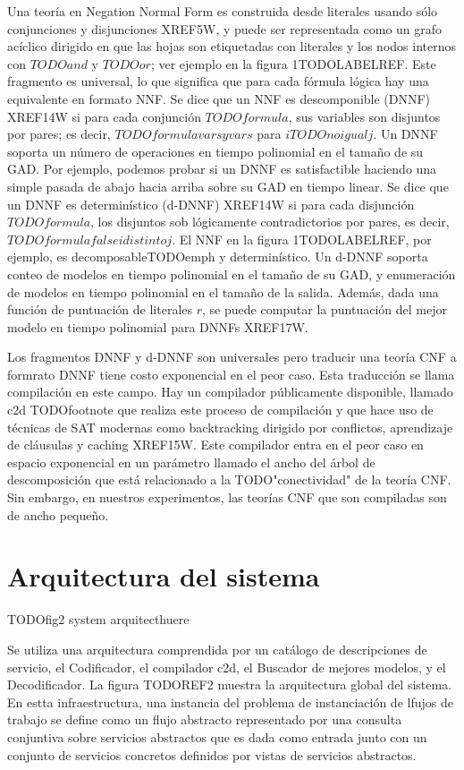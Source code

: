 \documentclass{article}
\begin{document}
Una teoría en Negation Normal Form es construida desde literales usando sólo
conjunciones y disjunciones XREF5W, y puede ser representada como un grafo
acíclico dirigido en que las hojas son etiquetadas con literales y los nodos
internos con $TODOand$ y $TODOor$; ver ejemplo en la figura  1TODOLABELREF. Este
fragmento es universal, lo que significa que para cada fórmula lógica hay una
equivalente en formato NNF. Se dice que un NNF es descomponible (DNNF) XREF14W
si para cada conjunción $TODOformula$, sus variables son disjuntos por pares; es
decir, $TODO formula vars y vars$ para $i TODOnoigual j$. Un DNNF soporta un
número de operaciones en tiempo polinomial en el tamaño de su GAD. Por ejemplo,
podemos probar si un DNNF es satisfactible haciendo una simple pasada de abajo
hacia arriba sobre su GAD en tiempo linear. Se dice que un DNNF es
determinístico (d-DNNF) XREF14W si para cada disjunción $TODOformula$, los
disjuntos sob lógicamente contradictorios por pares, es decir, $TODO formula
false idistintoj$. El NNF en la figura 1TODOLABELREF, por ejemplo, es
decomposableTODOemph y determinístico. Un d-DNNF soporta conteo de modelos en
tiempo polinomial en el tamaño de su GAD, y enumeración de modelos en tiempo
polinomial en el tamaño de la salida. Además, dada una función de puntuación de
literales $r$, se puede computar la puntuación del mejor modelo en tiempo
polinomial para DNNFs XREF17W.

Los fragmentos DNNF y d-DNNF son universales pero traducir una teoría CNF a
formrato DNNF tiene costo exponencial en el peor caso. Esta traducción se
llama compilación en este campo. Hay un compilador públicamente disponible,
llamado c2d TODOfootnote que realiza este proceso de compilación y que hace uso
de técnicas de SAT modernas como backtracking dirigido por conflictos,
aprendizaje de cláusulas y caching XREF15W. Este compilador entra en el peor
caso en espacio exponencial en un parámetro llamado el ancho del árbol de
descomposición que está relacionado a la TODO"conectividad" de la teoría CNF.
Sin embargo, en nuestros experimentos, las teorías CNF que son compiladas son de
ancho pequeño.

\section{Arquitectura del sistema}

TODOfig2 system arquitecthuere

Se utiliza una arquitectura comprendida por un catálogo de descripciones de
servicio, el Codificador, el compilador c2d, el Buscador de mejores modelos, y
el Decodificador. La figura TODOREF2 muestra la arquitectura global del sistema.
En estta infraestructura, una instancia del problema de instanciación de lfujos
de trabajo se define como un flujo abstracto representado por una consulta
conjuntiva sobre servicios abstractos que es dada como entrada junto con un
conjunto de servicios concretos definidos por vistas de servicios abstractos.
\end{document}
